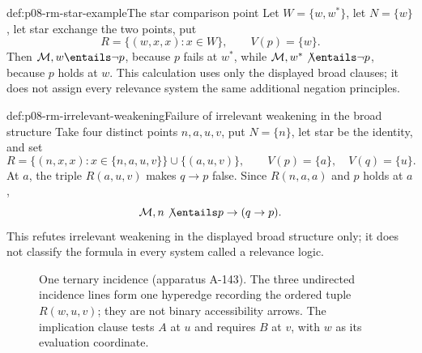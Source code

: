 \begin{hbexample}{def:p08-rm-star-example}{The star comparison point}
Let \(W=\{w,w^*\}\), let \(N=\{w\}\), let star exchange the two points,
put
\[
 R=\{(w,x,x):x\in W\},\qquad V(p)=\{w\}.
\]
Then \(\mathcal M,w\entails\neg p\), because \(p\) fails at \(w^*\), while
\(\mathcal M,w^*\not\entails\neg p\), because \(p\) holds at \(w\).  This
calculation uses only the displayed broad clauses; it does not assign every
relevance system the same additional negation principles.
\end{hbexample}

\begin{hbexample}{def:p08-rm-irrelevant-weakening}{Failure of irrelevant weakening in the broad structure}
Take four distinct points \(n,a,u,v\), put \(N=\{n\}\), let star be the
identity, and set
\[
 R=\{(n,x,x):x\in\{n,a,u,v\}\}\cup\{(a,u,v)\},
 \qquad V(p)=\{a\},\quad V(q)=\{u\}.
\]
At \(a\), the triple \(R(a,u,v)\) makes \(q\to p\) false.  Since
\(R(n,a,a)\) and \(p\) holds at \(a\),
\[
 \mathcal M,n\not\entails p\to(q\to p).
\]
This refutes irrelevant weakening in the displayed broad structure only; it
does not classify the formula in every system called a relevance logic.
\end{hbexample}

\begin{figure}[!htbp]
\centering
{}
\caption{One ternary incidence (apparatus A-143).  The three undirected
incidence lines form one hyperedge recording the ordered tuple \(R(w,u,v)\);
they are not binary accessibility arrows.  The implication clause tests
\(A\) at \(u\) and requires \(B\) at \(v\), with \(w\) as its evaluation
coordinate.}
\label{fig:p08-rm-ternary}
\end{figure}

